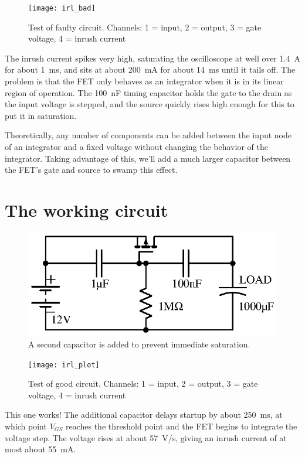 \documentclass[letterpaper,12pt]{article}
\begin{document}
\begin{figure}[H]
\centering
\texttt{[image: irl\_bad]}
\caption{Test of faulty circuit. Channels: 1 = input, 2 = output, 3 = gate voltage, 4 = inrush current}
\end{figure}

The inrush current spikes very high, saturating the oscilloscope at well over
\SI{1.4}{A} for about \SI{1}{ms}, and sits at about \SI{200}{mA} for about
\SI{14}{ms} until it tails off.
The problem is that the FET only behaves as an integrator when it is in its
linear region of operation.  The \SI{100}{nF} timing capacitor holds the gate
to the drain as the input voltage is stepped, and the source quickly rises high
enough for this to put it in saturation.

Theoretically, any number of components can be added between the input node of
an integrator and a fixed voltage without changing the behavior of the integrator.
Taking advantage of this, we'll add a much larger capacitor between the FET's gate
and source to swamp this effect.

\section{The working circuit}
\label{sec:good}

\begin{figure}[H]
\centering
\includegraphics{do_this}
\caption{A second capacitor is added to prevent immediate saturation.}
\end{figure}

\begin{figure}[H]
\centering
\texttt{[image: irl\_plot]}
\caption{Test of good circuit. Channels: 1 = input, 2 = output, 3 = gate voltage, 4 = inrush current}
\end{figure}

This one works! The additional capacitor delays startup by about \SI{250}{ms}, at which
point $V_{GS}$ reaches the threshold point and the FET begins to integrate the voltage
step. The voltage rises at about \SI{57}{V/s}, giving an inrush current of at most
about \SI{55}{mA}.
\end{document}
